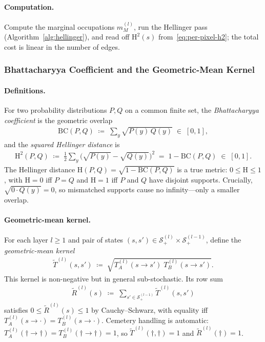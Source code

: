 \documentclass[twoside]{article}
\newcommand{\1}{\mathbf{1}}
\begin{document}
\paragraph{Computation.}
Compute the marginal occupations $m_M^{(l)}$, run the Hellinger pass
(Algorithm~\ref{alg:hellinger}), and read off $\mathrm{H}^2(s)$ from~\eqref{eq:per-pixel-h2}; the
total cost is linear in the number of edges.

\subsubsection{Bhattacharyya Coefficient and the Geometric-Mean Kernel}\label{sec:lmp-bc}

\paragraph{Definitions.}
For two probability distributions $P, Q$ on a common finite set, the \emph{Bhattacharyya
coefficient} is the geometric overlap
\begin{align}\label{eq:bc-def}
    \mathrm{BC}(P, Q) \;\coloneqq\; \sum_{y} \sqrt{P(y)\, Q(y)} \;\in\; [0, 1],
\end{align}
and the \emph{squared Hellinger distance} is
\begin{align}\label{eq:hellinger-def}
    \mathrm{H}^2(P, Q) \;\coloneqq\; \tfrac{1}{2} \sum_y \bigl(\sqrt{P(y)} - \sqrt{Q(y)}\bigr)^2 \;=\;
    1 - \mathrm{BC}(P, Q) \;\in\; [0, 1].
\end{align}
The Hellinger distance $\mathrm{H}(P,Q) = \sqrt{1 - \mathrm{BC}(P,Q)}$ is a true metric: $0 \leq
    \mathrm{H} \leq 1$, with $\mathrm{H} = 0$ iff $P = Q$ and $\mathrm{H} = 1$ iff $P$ and $Q$ have
disjoint supports.  Crucially, $\sqrt{0 \cdot Q(y)} = 0$, so mismatched supports cause no
infinity---only a smaller overlap.

\paragraph{Geometric-mean kernel.}
For each layer $l \geq 1$ and pair of states $(s, s') \in \mathcal{S}^{(l)}_+ \times
    \mathcal{S}^{(l-1)}_+$, define the \emph{geometric-mean kernel}
\begin{align}\label{eq:geom-kernel}
    \widetilde{T}^{(l)}(s, s') \;\coloneqq\; \sqrt{T^{(l)}_A(s \to s')\; T^{(l)}_B(s \to s')}.
\end{align}
This kernel is non-negative but in general sub-stochastic.  Its row sum
\begin{align}\label{eq:geom-rowsum}
    \widetilde{R}^{(l)}(s) \;\coloneqq\; \sum_{s' \in \mathcal{S}^{(l-1)}_+} \widetilde{T}^{(l)}(s, s')
\end{align}
satisfies $0 \leq \widetilde{R}^{(l)}(s) \leq 1$ by Cauchy--Schwarz, with equality iff $T^{(l)}_A(s
    \to \cdot) = T^{(l)}_B(s \to \cdot)$.  Cemetery handling is automatic: $T^{(l)}_A(\dagger \to
    \dagger) = T^{(l)}_B(\dagger \to \dagger) = 1$, so $\widetilde{T}^{(l)}(\dagger, \dagger) = 1$ and
$\widetilde{R}^{(l)}(\dagger) = 1$.
\end{document}
